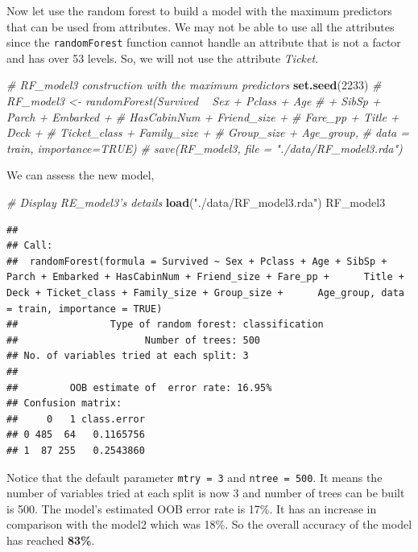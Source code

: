 \documentclass[
]{book}
\newenvironment{Shaded}{\begin{snugshade}}{\end{snugshade}}
\newcommand{\CommentTok}[1]{\textcolor[rgb]{0.56,0.35,0.01}{\textit{#1}}}
\newcommand{\DecValTok}[1]{\textcolor[rgb]{0.00,0.00,0.81}{#1}}
\newcommand{\KeywordTok}[1]{\textcolor[rgb]{0.13,0.29,0.53}{\textbf{#1}}}
\newcommand{\NormalTok}[1]{#1}
\newcommand{\StringTok}[1]{\textcolor[rgb]{0.31,0.60,0.02}{#1}}
\begin{document}
Now let use the random forest to build a model with the maximum predictors that can be used from attributes. We may not be able to use all the attributes since the \texttt{randomForest} function cannot handle an attribute that is not a factor and has over 53 levels. So, we will not use the attribute \emph{Ticket}.

\begin{Shaded}
\begin{Highlighting}[]
\CommentTok{# RF_model3 construction with the maximum predictors}
\KeywordTok{set.seed}\NormalTok{(}\DecValTok{2233}\NormalTok{)}
\CommentTok{# RF_model3 <- randomForest(Survived ~ Sex + Pclass + Age }
\CommentTok{#                           + SibSp + Parch + Embarked +}
\CommentTok{#                             HasCabinNum + Friend_size +}
\CommentTok{#                             Fare_pp + Title + Deck +}
\CommentTok{#                             Ticket_class + Family_size +}
\CommentTok{#                             Group_size + Age_group, }
\CommentTok{#                           data = train, importance=TRUE)}
\CommentTok{# save(RF_model3, file = "./data/RF_model3.rda")}
\end{Highlighting}
\end{Shaded}

We can assess the new model,

\begin{Shaded}
\begin{Highlighting}[]
\CommentTok{# Display RE_model3's details}
\KeywordTok{load}\NormalTok{(}\StringTok{"./data/RF_model3.rda"}\NormalTok{)}
\NormalTok{RF_model3}
\end{Highlighting}
\end{Shaded}

\begin{verbatim}
## 
## Call:
##  randomForest(formula = Survived ~ Sex + Pclass + Age + SibSp +      Parch + Embarked + HasCabinNum + Friend_size + Fare_pp +      Title + Deck + Ticket_class + Family_size + Group_size +      Age_group, data = train, importance = TRUE) 
##                Type of random forest: classification
##                      Number of trees: 500
## No. of variables tried at each split: 3
## 
##         OOB estimate of  error rate: 16.95%
## Confusion matrix:
##     0   1 class.error
## 0 485  64   0.1165756
## 1  87 255   0.2543860
\end{verbatim}

Notice that the default parameter \texttt{mtry\ =\ 3} and \texttt{ntree\ =\ 500}. It means the number of variables tried at each split is now 3 and number of trees can be built is 500. The model's estimated OOB error rate is 17\%. It has an increase in comparison with the model2 which was 18\%. So the overall accuracy of the model has reached \textbf{83\%}.
\end{document}
